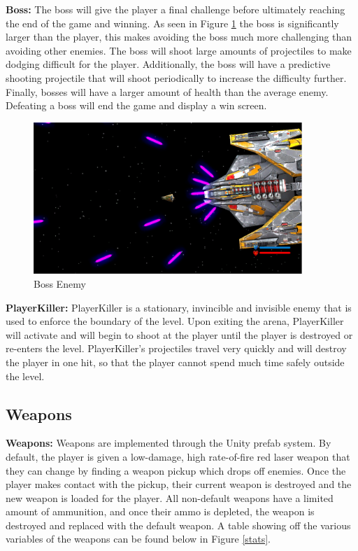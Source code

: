 \documentclass[12pt]{article}       %
\begin{document}
	{\bf Boss:} The boss will give the player a final challenge before ultimately reaching the end of the game and winning. As seen in Figure \ref{BossImage} the boss is significantly larger than the player, this makes avoiding the boss much more challenging than avoiding other enemies. The boss will shoot large amounts of projectiles to make dodging difficult for the player. Additionally, the boss will have a predictive shooting projectile that will shoot periodically to increase the difficulty further. Finally, bosses will have a larger amount of health than the average enemy. Defeating a boss will end the game and display a win screen. \\

\begin{figure} [H]\centering  \includegraphics[width=4in]{BossShooting.png} \caption{Boss Enemy} \label{BossImage} \end{figure} 

{\bf PlayerKiller:} PlayerKiller is a stationary, invincible and invisible enemy that is used to enforce the boundary of the level. Upon exiting the arena, PlayerKiller will activate and will begin to shoot at the player until the player is destroyed or re-enters the level. PlayerKiller's projectiles travel very quickly and will destroy the player in one hit, so that the player cannot spend much time safely outside the level.


\subsection{Weapons} %

{\bf Weapons:} Weapons are implemented through the Unity prefab system. By default, the player is given a low-damage, high rate-of-fire red laser weapon that they can change by finding a weapon pickup which drops off enemies. Once the player makes contact with the pickup, their current weapon is destroyed and the new weapon is loaded for the player. All non-default weapons have a limited amount of ammunition, and once their ammo is depleted, the weapon is destroyed and replaced with the default weapon. A table showing off the various variables of the weapons can be found below in Figure \ref{stats}.
\end{document}
